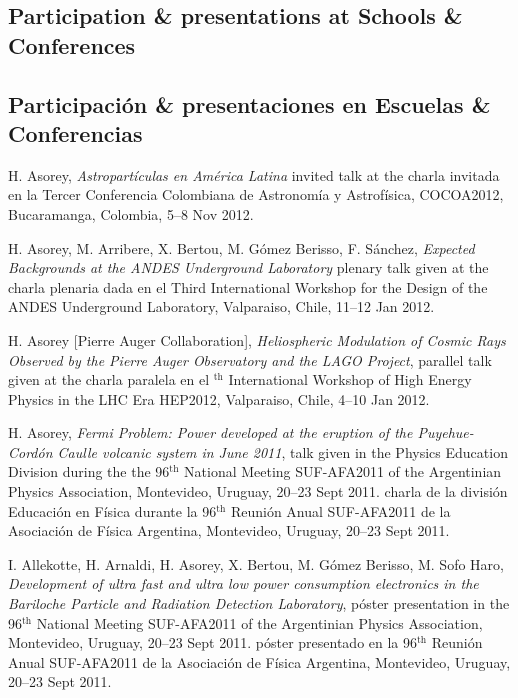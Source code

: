 \ifeng
\subsection*{Participation \& presentations at Schools \& Conferences}
\else
\subsection*{Participación \& presentaciones en Escuelas \& Conferencias}
\fi
\noindent
\begin{etaremune}

\item {} H. Asorey, {\emph{Astropartículas en América Latina}}
\ifeng
invited talk at the
\else
charla invitada en la 
\fi
Tercer Conferencia Colombiana de Astronomía y Astrofísica, COCOA2012, Bucaramanga, Colombia, 5--8 Nov 2012.

\item {} H. Asorey, M. Arribere, X. Bertou, M. Gómez Berisso, F. Sánchez,
{\emph{Expected Backgrounds at the ANDES Underground Laboratory}}
\ifeng
plenary talk given at the
\else
charla plenaria dada en el
\fi
Third International Workshop for the Design of the ANDES Underground Laboratory, Valparaiso, Chile, 11--12 Jan 2012.

\item {}H. Asorey [Pierre Auger Collaboration], {\emph{Heliospheric
Modulation of Cosmic Rays Observed by the Pierre Auger Observatory and the LAGO
Project}}, 
\ifeng
parallel talk given at the 
\else
charla paralela en el 
$^{\mathrm{th}}$ International Workshop of High Energy Physics in the LHC Era HEP2012, Valparaiso, Chile, 4--10 Jan 2012.

\item {}H. Asorey, {\emph{Fermi Problem: Power developed at the eruption of
the Puyehue-Cordón Caulle volcanic system in June 2011}}, 
\ifeng
talk given in the Physics Education Division during the the 96$^{\mathrm{th}}$ National Meeting SUF-AFA2011 of the Argentinian Physics Association, Montevideo, Uruguay, 20--23 Sept 2011.
\else
charla de la división Educación en Física durante la 96$^{\mathrm{th}}$ Reunión Anual SUF-AFA2011 de la Asociación de Física Argentina, Montevideo, Uruguay, 20--23 Sept 2011.
\fi

\item {}I. Allekotte, H. Arnaldi, H. Asorey, X. Bertou, M. Gómez Berisso,
M. Sofo Haro, {\emph{Development of ultra fast and ultra low power consumption
electronics in the Bariloche Particle and Radiation Detection Laboratory}},
\ifeng
póster presentation in the 96$^{\mathrm{th}}$ National Meeting SUF-AFA2011 of the Argentinian Physics Association, Montevideo, Uruguay, 20--23 Sept 2011.
\else
póster presentado en la 96$^{\mathrm{th}}$ Reunión Anual SUF-AFA2011 de la Asociación de Física Argentina, Montevideo, Uruguay, 20--23 Sept 2011.
\fi


\end{etaremune}
